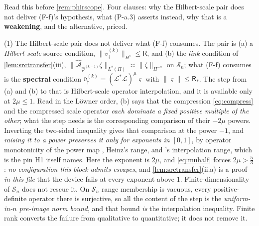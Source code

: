 \begin{remark}\label{rem:pasrc}
Read this before \cref{rem:phirscope}. Four clauses: why the Hilbert-scale pair does not deliver
(F-f)'s hypothesis, what (P-a.3) asserts instead, why that is a \textbf{weakening}, and the alternative,
priced.

(1) The Hilbert-scale pair does not deliver what (F-f) consumes. The pair is (a) a
\emph{Hilbert-scale} source condition,
$\|\bar v^{(k)}_\dagger\|_{H^{s}}\le\mathsf R$, and (b) the \emph{link} condition of
\cref{lem:srctransfer}(iii), $\|\hat{\mathcal A}_{\hat\varphi^{(k-1)}}\zeta\|_{L^{2}(\Pi)}\asymp\|\zeta\|_{H^{-a}}$
on $\mathcal S_n$; what (F-f) consumes is the \textbf{spectral}
condition $\bar v^{(k)}_\dagger=(\mathcal L^{\ast}\mathcal L)^{\mu}\varsigma$ with
$\|\varsigma\|\le\mathsf R_\ast$. The step from (a) and (b) to that is Hilbert-scale operator
interpolation, and it is available only at $2\mu\le1$. Read in the L\"owner order, (b) says that the
compression \eqref{eq:compress} and the compressed scale operator \emph{each dominate a fixed positive
multiple of the other}; what the step needs is the corresponding comparison of their $-2\mu$ powers.
Inverting the two-sided inequality gives that comparison at the power $-1$, and \emph{raising it to a
power preserves it only for exponents in $[0,1]$}, by operator monotonicity of the power map
, Heinz's range, and \citet[\S8.5]{engl2000}'s interpolation range, which is the pin H1 itself names.
Here the exponent is $2\mu$, and \eqref{eq:muhalf} forces $2\mu>\tfrac53$: \emph{no configuration this
block admits escapes}, and \cref{lem:srctransfer}(ii.a) is a proof \emph{in this file} that the device
fails at every exponent above $1$. Finite-dimensionality of $\mathcal S_n$ does not rescue it. On
$\mathcal S_n$ range
membership is vacuous, every positive-definite operator there is surjective, so all the content of
the step is the \emph{uniform-in-$n$ pre-image norm bound}, and that bound \emph{is} the interpolation
inequality. Finite rank converts the failure from qualitative to quantitative; it does not remove it.


\end{remark}
